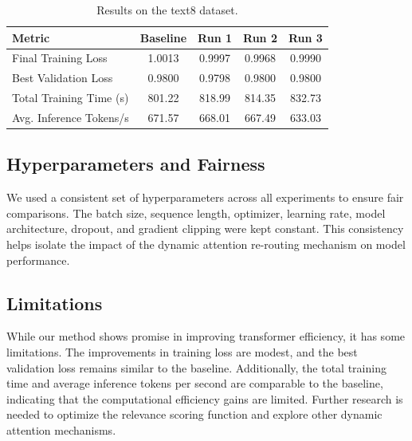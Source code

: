 \documentclass{article} %
\begin{document}
\begin{table}[h]
    \centering
    \begin{tabular}{lcccc}
        \toprule
        \textbf{Metric} & \textbf{Baseline} & \textbf{Run 1} & \textbf{Run 2} & \textbf{Run 3} \\
        \midrule
        Final Training Loss & 1.0013 & 0.9997 & 0.9968 & 0.9990 \\
        Best Validation Loss & 0.9800 & 0.9798 & 0.9800 & 0.9800 \\
        Total Training Time (s) & 801.22 & 818.99 & 814.35 & 832.73 \\
        Avg. Inference Tokens/s & 671.57 & 668.01 & 667.49 & 633.03 \\
        \bottomrule
    \end{tabular}
    \caption{Results on the text8 dataset.}
    \label{tab:text8_results}
\end{table}

\subsection{Hyperparameters and Fairness}
We used a consistent set of hyperparameters across all experiments to ensure fair comparisons. The batch size, sequence length, optimizer, learning rate, model architecture, dropout, and gradient clipping were kept constant. This consistency helps isolate the impact of the dynamic attention re-routing mechanism on model performance.

\subsection{Limitations}
While our method shows promise in improving transformer efficiency, it has some limitations. The improvements in training loss are modest, and the best validation loss remains similar to the baseline. Additionally, the total training time and average inference tokens per second are comparable to the baseline, indicating that the computational efficiency gains are limited. Further research is needed to optimize the relevance scoring function and explore other dynamic attention mechanisms.
\end{document}
